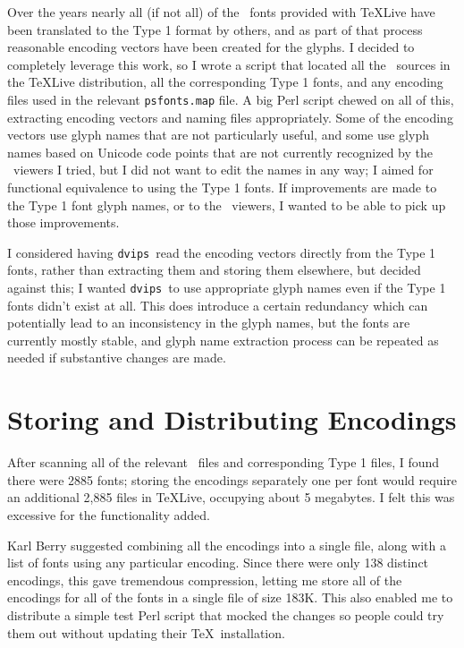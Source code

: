 \documentclass{ltugboat}
\def\PDF{\acro{PDF}}
\def\dvips{\texttt{dvips}}
\begin{document}
Over the years nearly all (if not all) of the \MF\ fonts
provided with \TeX Live have been translated to the Type 1
format by others, and as part of that process reasonable
encoding vectors have been created for the glyphs.  I
decided to completely leverage this work, so I wrote a
script that located all the \MF\ sources in the \TeX Live
distribution, all the corresponding Type 1 fonts, and any
encoding files used in the relevant \texttt{psfonts.map}
file.  A big Perl script chewed on all of this, extracting
encoding vectors and naming files appropriately.  Some of
the encoding vectors use glyph names that are not particularly
useful, and some use glyph names based on Unicode code
points that are not currently recognized by the \PDF\ viewers
I tried, but I did not want to edit the names in any way;
I aimed for functional equivalence to using the Type 1
fonts.  If improvements are made to the Type 1 font glyph
names, or to the \PDF\ viewers, I wanted to be able to pick
up those improvements.

I considered having \dvips\ read the encoding vectors
directly from the Type 1 fonts, rather than extracting them
and storing them elsewhere, but decided against this; I wanted
\dvips\ to use appropriate glyph names even if the Type 1
fonts didn't exist at all.  This does introduce a certain
redundancy which can potentially lead to an inconsistency in
the glyph names, but the fonts are currently mostly stable, and
glyph name extraction process can be
repeated as needed if substantive changes are made.

\section{Storing and Distributing Encodings}

After scanning all of the relevant \MF\ files and corresponding
Type 1 files, I found there were 2885 fonts; storing the
encodings separately one per font would require an additional
2,885 files in \TeX Live, occupying about 5 megabytes.  I felt
this was excessive for the functionality added.

Karl Berry suggested combining all the encodings into a single
file, along with a list of fonts using any particular encoding.
Since there were only 138 distinct encodings, this gave
tremendous compression, letting me store all of the encodings
for all of the fonts in a single file of size 183K.  This also
enabled me to distribute a simple test Perl script that mocked
the changes so people could try them out without updating their
\TeX\ installation.
\end{document}
